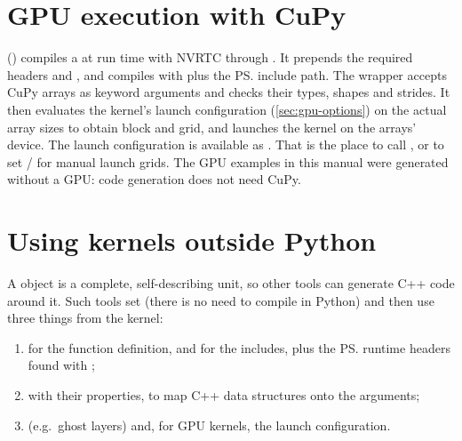 \section{GPU execution with CuPy}\label{sec:gpu-execution}

 () compiles a  at run time with
NVRTC through . It prepends the required headers and
, and compiles with  plus the \ps{}
include path. The wrapper  accepts CuPy arrays as keyword
arguments and checks their types, shapes and strides. It then evaluates the kernel's
launch configuration (\cref{sec:gpu-options}) on the actual array sizes to obtain block
and grid, and launches the kernel on the arrays' device. The launch configuration is
available as . That is the place to call
, or to set / for manual
launch grids. The GPU examples in this manual were generated without a GPU: code
generation does not need CuPy.

\section{Using kernels outside Python}\label{sec:external-use}

A  object is a complete, self-describing unit, so other tools can generate
C++ code around it. Such tools set  (there is no need to
compile in Python) and then use three things from the kernel:
\begin{enumerate}
  \item {} for the function definition, and
         for the includes, plus the \ps{} runtime headers
        found with ;
  \item {} with their properties, to map C++ data structures onto
        the arguments;
  \item {} (e.g.\ ghost layers) and, for GPU kernels, the launch
        configuration.
\end{enumerate}


